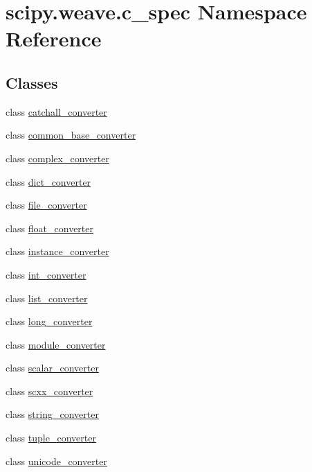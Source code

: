 \hypertarget{namespacescipy_1_1weave_1_1c__spec}{}\section{scipy.\+weave.\+c\+\_\+spec Namespace Reference}
\label{namespacescipy_1_1weave_1_1c__spec}
\subsection*{Classes}
\begin{DoxyCompactItemize}
\item 
class \hyperlink{classscipy_1_1weave_1_1c__spec_1_1catchall__converter}{catchall\+\_\+converter}
\item 
class \hyperlink{classscipy_1_1weave_1_1c__spec_1_1common__base__converter}{common\+\_\+base\+\_\+converter}
\item 
class \hyperlink{classscipy_1_1weave_1_1c__spec_1_1complex__converter}{complex\+\_\+converter}
\item 
class \hyperlink{classscipy_1_1weave_1_1c__spec_1_1dict__converter}{dict\+\_\+converter}
\item 
class \hyperlink{classscipy_1_1weave_1_1c__spec_1_1file__converter}{file\+\_\+converter}
\item 
class \hyperlink{classscipy_1_1weave_1_1c__spec_1_1float__converter}{float\+\_\+converter}
\item 
class \hyperlink{classscipy_1_1weave_1_1c__spec_1_1instance__converter}{instance\+\_\+converter}
\item 
class \hyperlink{classscipy_1_1weave_1_1c__spec_1_1int__converter}{int\+\_\+converter}
\item 
class \hyperlink{classscipy_1_1weave_1_1c__spec_1_1list__converter}{list\+\_\+converter}
\item 
class \hyperlink{classscipy_1_1weave_1_1c__spec_1_1long__converter}{long\+\_\+converter}
\item 
class \hyperlink{classscipy_1_1weave_1_1c__spec_1_1module__converter}{module\+\_\+converter}
\item 
class \hyperlink{classscipy_1_1weave_1_1c__spec_1_1scalar__converter}{scalar\+\_\+converter}
\item 
class \hyperlink{classscipy_1_1weave_1_1c__spec_1_1scxx__converter}{scxx\+\_\+converter}
\item 
class \hyperlink{classscipy_1_1weave_1_1c__spec_1_1string__converter}{string\+\_\+converter}
\item 
class \hyperlink{classscipy_1_1weave_1_1c__spec_1_1tuple__converter}{tuple\+\_\+converter}
\item 
class \hyperlink{classscipy_1_1weave_1_1c__spec_1_1unicode__converter}{unicode\+\_\+converter}
\end{DoxyCompactItemize}
